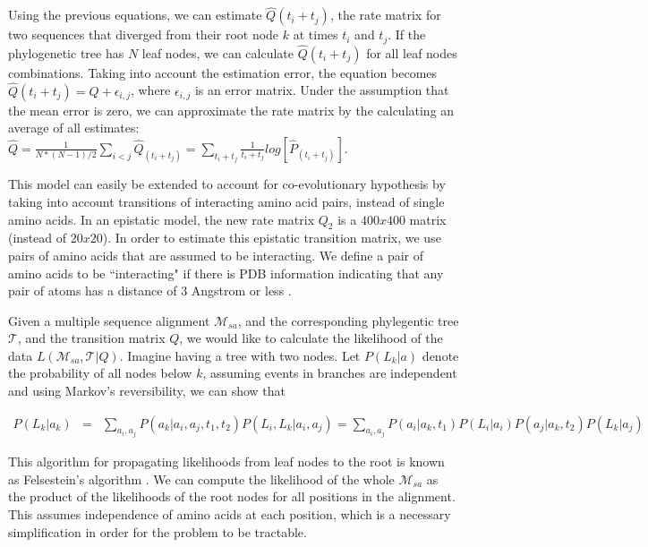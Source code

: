 Using the previous equations, we can estimate $\hat{Q}(t_i+t_j)$, the rate matrix for two sequences that diverged from their root node $k$ at times $t_i$ and $t_j$. If the phylogenetic tree has $N$ leaf nodes, we can calculate $\hat{Q}(t_i+t_j)$ for all leaf nodes combinations. Taking into account the estimation error, the equation becomes $\hat{Q}(t_i+t_j) = Q + \epsilon_{i,j}$, where $\epsilon_{i,j}$ is an error matrix. Under the assumption that the mean error is zero, we can approximate the rate matrix by the calculating an average of all estimates: $\hat{Q} = \frac{1}{N * (N-1)/2} \sum_{i < j} \hat{Q}_(t_i+t_j) = \sum_{t_i+t_j} \frac{1}{t_i+t_j} log[ \hat{P}_(t_i+t_j) ]$.

This model can easily be extended to account for co-evolutionary hypothesis by taking into account transitions of interacting amino acid pairs, instead of single amino acids. In an epistatic model, the new rate matrix $Q_2$ is a $400x400$ matrix (instead of $20x20$). In order to estimate this epistatic transition matrix, we use pairs of amino acids that are assumed to be interacting. We define a pair of amino acids to be ``interacting" if there is PDB information indicating that any pair of atoms has a distance of 3 Angstrom or less \cite{REF}.

Given a multiple sequence alignment $\mathcal{M}_{sa}$, and the corresponding phylegentic tree $\mathcal{T}$, and the transition matrix $Q$, we would like to calculate the likelihood of the data $L(\mathcal{M}_{sa}, \mathcal{T} | Q)$. Imagine having a tree with two nodes. Let $P(L_k|a)$ denote the probability of all nodes below $k$, assuming events in branches are independent and using Markov's reversibility, we can show that \cite{durbin1998biological}

\begin{eqnarray*}
P(L_k |  a_k ) 
& = & \sum_{a_i, a_j}{ P(a_k | a_i, a_j, t_1, t_2) P(L_i, L_k | a_i, a_j)  }
= \sum_{a_i, a_j}{ P(a_i | a_k, t_1) P(L_i | a_i ) P(a_j | a_k, t_2) P( L_k | a_j) }
\end{eqnarray*}

This algorithm for propagating likelihoods from leaf nodes to the root is known as Felsestein's algorithm \cite{felsenstein2004inferring}. We can compute the likelihood of the whole $\mathcal{M}_{sa}$ as the product of the likelihoods of the root nodes for all positions in the alignment. This assumes independence of amino acids at each position, which is a necessary simplification in order for the problem to be tractable.

